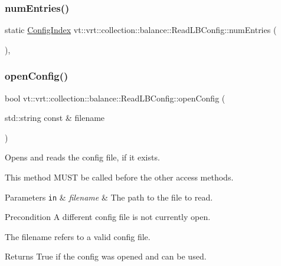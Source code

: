 \subsubsection{\texorpdfstring{num\+Entries()}{numEntries()}}
{\footnotesize\ttfamily static \hyperlink{namespacevt_1_1vrt_1_1collection_1_1balance_ac1bb9eee8129549177880dbb4e5f6a34}{Config\+Index} vt\+::vrt\+::collection\+::balance\+::\+Read\+L\+B\+Config\+::num\+Entries (\begin{DoxyParamCaption}{ }\end{DoxyParamCaption})\hspace{0.3cm}{\ttfamily [inline]}, {\ttfamily [static]}}

\mbox{\label{structvt_1_1vrt_1_1collection_1_1balance_1_1_read_l_b_config_a9fcbc87eb60d33c0e7d0cb363b8fdbb0}} 
\subsubsection{\texorpdfstring{open\+Config()}{openConfig()}}
{\footnotesize\ttfamily bool vt\+::vrt\+::collection\+::balance\+::\+Read\+L\+B\+Config\+::open\+Config (\begin{DoxyParamCaption}\item[{std\+::string const \&}]{filename }\end{DoxyParamCaption})\hspace{0.3cm}{\ttfamily [static]}}



Opens and reads the config file, if it exists. 

This method M\+U\+ST be called before the other access methods.


\begin{DoxyParams}[1]{Parameters}
\mbox{\tt in}  & {\em filename} & The path to the file to read.\\
\hline
\end{DoxyParams}
\begin{DoxyPrecond}{Precondition}
A different config file is not currently open. 

The filename refers to a valid config file.
\end{DoxyPrecond}
\begin{DoxyReturn}{Returns}
True if the config was opened and can be used. 
\end{DoxyReturn}
\mbox{\label{structvt_1_1vrt_1_1collection_1_1balance_1_1_read_l_b_config_a815d255cc8ca02dd7ead153b9dc20623}} 

